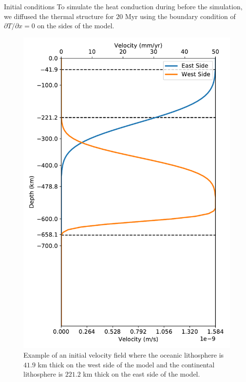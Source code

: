 \documentclass[final]{beamer}
\newlength{\colwidth}
\begin{document}
\begin{frame}[t]
\begin{columns}[t]
\begin{column}{\colwidth}
\begin{block}{Initial conditions}
      To simulate the heat conduction during before the simulation, we diffused the thermal structure for $20$ Myr using the boundary condition of $\partial T/\partial x=0$ on the sides of the model.

    \heading{\textcolor{darkblue}{Velocity field}}

      \begin{figure}
        \centering
        \includegraphics[width=0.15\paperwidth]{figures/velocity_profile.pdf}
        \caption{Example of an initial velocity field where the oceanic lithosphere is $41.9$ km thick on the west side of the model and the continental lithosphere is $221.2$ km thick on the east side of the model.}
        \label{fig:velocity-profile}
      \end{figure}
        

\end{block}
\end{column}
\end{columns}
\end{frame}
\end{document}

